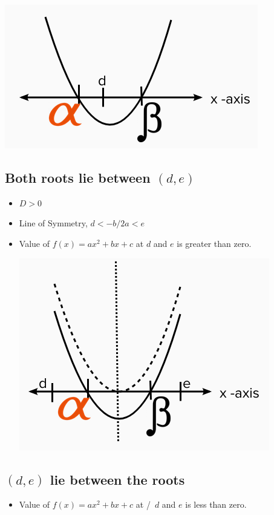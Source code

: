 \documentclass{book}
\begin{document}
	\includegraphics[scale=0.6]{condition2}
	
	\subsection{Both roots lie between $(d,e)$}
	\begin{itemize}
		\item $D>0$
		\item Line of Symmetry, $d < -b/2a < e$
		\item Value of $f(x) = ax^2 + bx + c$ at $d$ and $e$ is greater than zero.
		
		\includegraphics[scale=0.6]{condition3}
	\end{itemize}
	
	\subsection{$(d,e)$ lie between the roots}
	\begin{itemize}
		\item Value of $f(x) = ax^2 + bx + c$ at
		/\ $d$ and $e$ is less than zero.
	\end{itemize}
	
\end{document}
